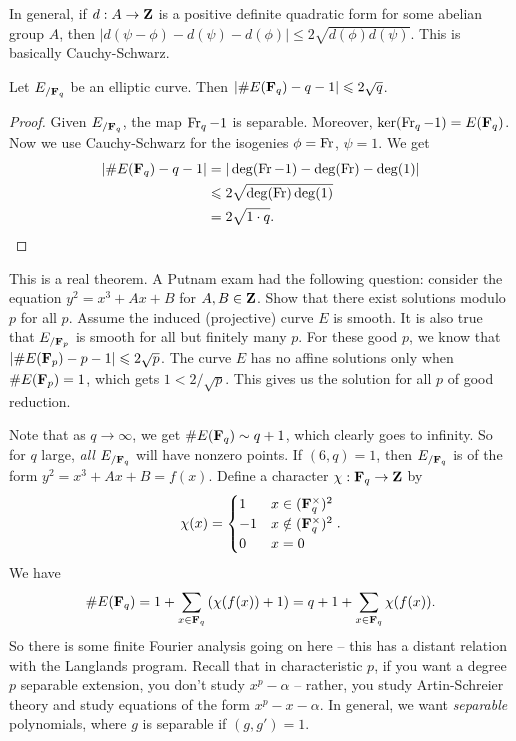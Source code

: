 In general, if $d:A\to \mathbf{Z}$ is a positive definite quadratic form for 
some abelian group $A$, then 
$|d(\psi-\phi)-d(\psi)-d(\phi)|\leqslant 2\sqrt{d(\phi)d(\psi)}$. This is 
basically Cauchy-Schwarz. 

\begin{theorem}
Let $E_{/\mathbf{F}_q}$ be an elliptic curve. Then $|\#E(\mathbf{F}_q)-q-1|\leqslant 2\sqrt q$. 
\end{theorem}
\begin{proof}
Given $E_{/\mathbf{F}_q}$, the map $\operatorname{Fr}_q-1$ is separable. Moreover, 
$\ker(\operatorname{Fr}_q-1) = E(\mathbf{F}_q)$. Now we use Cauchy-Schwarz for the isogenies 
$\phi=\operatorname{Fr}$, $\psi=1$. We get 
\begin{align*}
  |\#E(\mathbf{F}_q)-q-1| 
    &=|\deg(\operatorname{Fr}-1)-\deg(\operatorname{Fr})-\deg(1)| \\
    &\leqslant 2\sqrt{\deg(\operatorname{Fr})\deg(1)} \\
    &= 2\sqrt{1\cdot q} .
\end{align*}
\end{proof}

This is a real theorem. A Putnam exam had the following question: 
consider the equation $y^2=x^3+A x+B$ for $A,B\in \mathbf{Z}$. Show that there exist 
solutions modulo $p$ for all $p$. Assume the induced (projective) curve $E$ 
is smooth. It is also true that $E_{/\mathbf{F}_p}$ is smooth for all but finitely 
many $p$. For these good $p$, we know that 
$|\# E(\mathbf{F}_p) - p - 1|\leqslant 2\sqrt p$. The curve $E$ has no affine 
solutions only when $\# E(\mathbf{F}_p)=1$, which gets $1<2/\sqrt p$. This gives us 
the solution for all $p$ of good reduction. 

Note that as $q\to \infty$, we get $\# E(\mathbf{F}_q) \sim q+1$, which clearly goes to 
infinity. So for $q$ large, \emph{all} $E_{/\mathbf{F}_q}$ will have nonzero points. 
If $(6,q)=1$, then $E_{/\mathbf{F}_q}$ is of the form $y^2=x^3+A x+B=f(x)$. Define a 
character $\chi:\mathbf{F}_q\to \mathbf{Z}$ by 
\[
  \chi(x) = \begin{cases} 1 & x\in (\mathbf{F}_q^\times)^2 \\ -1 & x\notin (\mathbf{F}_q^\times)^2 \\ 0 & x=0 \end{cases}.
\]
We have 
\[
  \# E(\mathbf{F}_q) = 1 + \sum_{x\in \mathbf{F}_q}\left(\chi(f(x))+1\right) = q+1 + \sum_{x\in \mathbf{F}_q} \chi(f(x)) .
\]
So there is some finite Fourier analysis going on here -- this has a distant 
relation with the Langlands program. Recall that in characteristic $p$, if you 
want a degree $p$ separable extension, you don't study $x^p-\alpha$ -- rather, you 
study Artin-Schreier theory and study equations of the form $x^p-x-\alpha$. In 
general, we want \emph{separable} polynomials, where $g$ is separable if 
$(g,g')=1$. 


